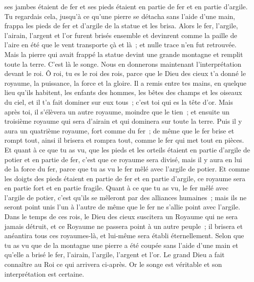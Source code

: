 \begin{multicols}{2}
ses jambes étaient de fer et ses pieds étaient en partie de fer et en partie d'argile.
Tu regardais cela, jusqu'à ce qu'une pierre se détacha sans l'aide d'une main, frappa les pieds de fer et d'argile de la statue et les brisa.
Alors le fer, l'argile, l'airain, l'argent et l'or furent brisés ensemble et devinrent comme la paille de l'aire en été que le vent transporte çà et là~; et nulle trace n'en fut retrouvée. Mais la pierre qui avait frappé la statue devint une grande montagne et remplit toute la terre.
C'est là le songe. Nous en donnerons maintenant l'interprétation devant le roi.
Ô roi, tu es le roi des rois, parce que le Dieu des cieux t'a donné le royaume, la puissance, la force et la gloire.
Il a remis entre tes mains, en quelque lieu qu'ils habitent, les enfants des hommes, les bêtes des champs et les oiseaux du ciel, et il t'a fait dominer sur eux tous~; c'est toi qui es la tête d'or.
Mais après toi, il s'élèvera un autre royaume, moindre que le tien~; et ensuite un troisième royaume qui sera d'airain et qui dominera sur toute la terre.
Puis il y aura un quatrième royaume, fort comme du fer~; de même que le fer brise et rompt tout, ainsi il brisera et rompra tout, comme le fer qui met tout en pièces.
Et quant à ce que tu as vu, que les pieds et les orteils étaient en partie d'argile de potier et en partie de fer, c'est que ce royaume sera divisé, mais il y aura en lui de la force du fer, parce que tu as vu le fer mêlé avec l'argile de potier.
Et comme les doigts des pieds étaient en partie de fer et en partie d'argile, ce royaume sera en partie fort et en partie fragile.
 Quant à ce que tu as vu, le fer mêlé avec l'argile de potier, c'est qu'ils se mêleront par des alliances humaines~; mais ils ne seront point unis l'un à l'autre de même que le fer ne s'allie point avec l'argile.
Dans le temps de ces rois, le Dieu des cieux suscitera un Royaume qui ne sera jamais détruit, et ce Royaume ne passera point à un autre peuple~; il brisera et anéantira tous ces royaumes-là, et lui-même sera établi éternellement.
Selon que tu as vu que de la montagne une pierre a été coupée sans l'aide d'une main et qu'elle a brisé le fer, l'airain, l'argile, l'argent et l'or. Le grand Dieu a fait connaître au Roi ce qui arrivera ci-après. Or le songe est véritable et son interprétation est certaine.

\end{multicols}
